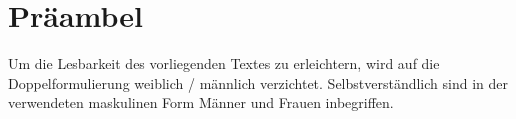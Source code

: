 \section*{Präambel}

Um die Lesbarkeit des vorliegenden Textes zu erleichtern, wird auf die
Doppelformulierung weiblich / männlich verzichtet. Selbstverständlich sind
in der verwendeten maskulinen Form Männer und Frauen inbegriffen.
